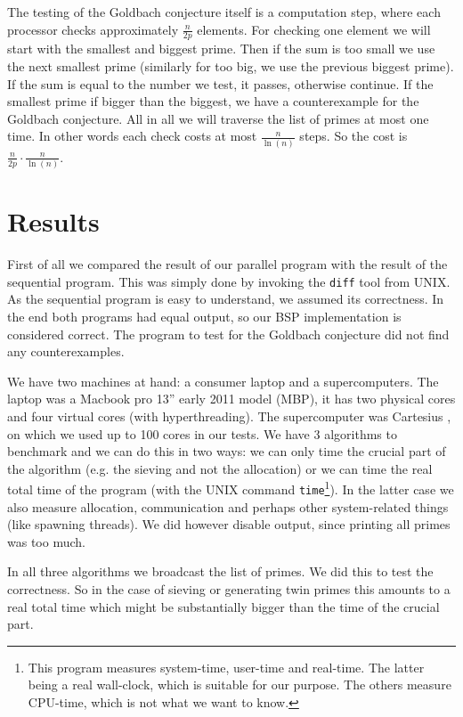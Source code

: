 \documentclass{article}
\begin{document}
The testing of the Goldbach conjecture itself is a computation step, where each processor checks approximately $\frac{n}{2p}$ elements. For checking one element we will start with the smallest and biggest prime. Then if the sum is too small we use the next smallest prime (similarly for too big, we use the previous biggest prime). If the sum is equal to the number we test, it passes, otherwise continue. If the smallest prime if bigger than the biggest, we have a counterexample for the Goldbach conjecture. All in all we will traverse the list of primes at most one time. In other words each check costs at most $\frac{n}{\ln(n)}$ steps. So the cost is $\frac{n}{2p} \cdot \frac{n}{\ln(n)}$.


\section{Results}
First of all we compared the result of our parallel program with the result of the sequential program. This was simply done by invoking the \texttt{diff} tool from UNIX. As the sequential program is easy to understand, we assumed its correctness. In the end both programs had equal output, so our BSP implementation is considered correct. The program to test for the Goldbach conjecture did not find any counterexamples.

We have two machines at hand: a consumer laptop and a supercomputers. The laptop was a Macbook pro 13'' early 2011 model (MBP), it has two physical cores and four virtual cores (with hyperthreading). The supercomputer was Cartesius \cite{Cartesius}, on which we used up to 100 cores in our tests. We have 3 algorithms to benchmark and we can do this in two ways: we can only time the crucial part of the algorithm (e.g. the sieving and not the allocation) or we can time the real total time of the program (with the UNIX command \texttt{time}\footnote{This program measures system-time, user-time and real-time. The latter being a real wall-clock, which is suitable for our purpose. The others measure CPU-time, which is not what we want to know.}). In the latter case we also measure allocation, communication and perhaps other system-related things (like spawning threads). We did however disable output, since printing all primes was too much.

In all three algorithms we broadcast the list of primes. We did this to test the correctness. So in the case of sieving or generating twin primes this amounts to a real total time which might be substantially bigger than the time of the crucial part.
\end{document}
